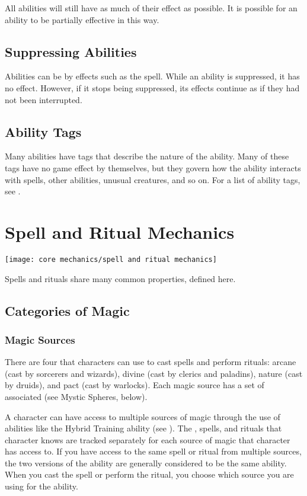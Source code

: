         All abilities will still have as much of their effect as possible.
        It is possible for an ability to be partially effective in this way.

    \subsection{Suppressing Abilities}\label{Suppressing Abilities}
        Abilities can be  by effects such as the  spell.
        While an ability is suppressed, it has no effect.
        However, if it stops being suppressed, its effects continue as if they had not been interrupted.

    \subsection{Ability Tags}
        Many abilities have tags that describe the nature of the ability.
        Many of these tags have no game effect by themselves, but they govern how the ability interacts with spells, other abilities, unusual creatures, and so on.
        For a list of ability tags, see .

\section{Spell and Ritual Mechanics}\label{Spell and Ritual Mechanics}
    \texttt{[image: core mechanics/spell and ritual mechanics]}

    Spells and rituals share many common properties, defined here.

    \subsection{Categories of Magic}

    \subsubsection{Magic Sources}
        There are four  that characters can use to cast spells and perform rituals: arcane (cast by sorcerers and wizards), divine (cast by clerics and paladins), nature (cast by druids), and pact (cast by warlocks).
        Each magic source has a set of associated  (see Mystic Spheres, below).

            A character can have access to multiple sources of magic through the use of abilities like the Hybrid Training ability (see ).
            The , spells, and rituals that character knows are tracked separately for each source of magic that character has access to.
            If you have access to the same spell or ritual from multiple sources, the two versions of the ability are generally considered to be the same ability.
            When you cast the spell or perform the ritual, you choose which source you are using for the ability.

